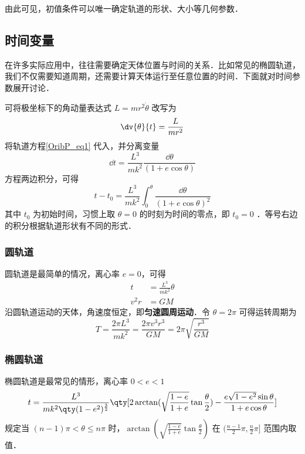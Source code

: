 由此可见，初值条件可以唯一确定轨道的形状、大小等几何参数．

\subsection{时间变量}
在许多实际应用中，往往需要确定天体位置与时间的关系．比如常见的椭圆轨道，我们不仅需要知道周期，还需要计算天体运行至任意位置的时间．下面就对时间参数展开讨论．

可将极坐标下的角动量表达式 $ L  = mr^2\dot{\theta}$ 改写为
\begin{equation} 
\dv{\theta}{t}=\frac{L}{mr^2}
\end{equation}
将轨道方程\autoref{OribP_eq1} 代入，并分离变量
\begin{equation}
\dd{t}=\frac{L^3}{mk^2}\frac{\dd{\theta}}{(1+e\cos\theta)}
\end{equation}
方程两边积分，可得
\begin{equation}\label{OribP_eq11}
t-t_0 = \frac{L^3}{mk^2}\int_0^{\theta} \frac{\dd{\theta}}{(1+e\cos\theta)^2}
\end{equation}
其中 $t_0$ 为初始时间，习惯上取 $\theta=0$ 的时刻为时间的零点，即 $t_0=0$ ．等号右边的积分根据轨道形状有不同的形式．

\subsubsection{圆轨道}
圆轨道是最简单的情况，离心率 $e=0$，可得
\begin{align}
t &=\frac{L^3}{mk^2}\theta \\
v^2r &=GM 
\end{align}
沿圆轨道运动的天体，角速度恒定，即\textbf{匀速圆周运动}．令 $\theta=2\pi$ 可得运转周期为
\begin{equation}
T=\frac{2\pi L^3}{mk^2}=\frac{2\pi v^3r^3}{GM}=2\pi \sqrt{\frac{r^3}{GM}}
\end{equation}

\subsubsection{椭圆轨道}
椭圆轨道是最常见的情形，离心率 $0<e<1$
\begin{equation}\label{OribP_eq14}
t = \frac{L^3}{mk^2\qty(1-e^2)^{\frac{3}{2}}}\qty[2\arctan(\sqrt{\frac{1-e}{1+e}}\tan\frac{\theta}{2})-\frac{e\sqrt{1-e^2}\sin\theta}{1+e\cos\theta}]
\end{equation}
规定当 $(n-1)\pi<\theta \leqslant n\pi$ 时，$\arctan(\sqrt{\frac{1-e}{1+e}}\tan\frac{\theta}{2})$ 在 $(\frac{n-1}{2}\pi,\frac{n}{2}\pi]$ 范围内取值．


